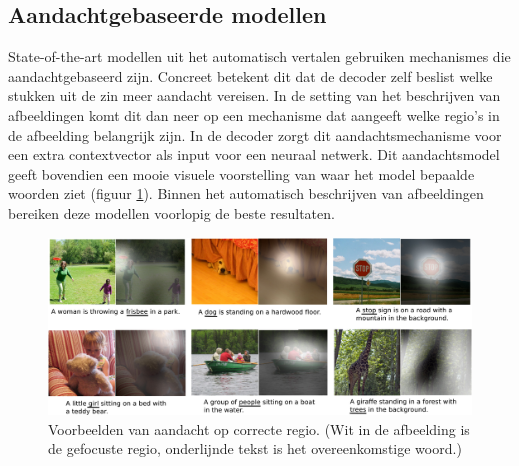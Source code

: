\subsection{Aandachtgebaseerde modellen}
State-of-the-art modellen uit het automatisch vertalen gebruiken mechanismes die aandachtgebaseerd zijn. Concreet betekent dit dat de decoder zelf beslist welke stukken uit de zin meer aandacht vereisen.
In de setting van het beschrijven van afbeeldingen komt dit dan neer op een mechanisme dat aangeeft welke regio's in de afbeelding belangrijk zijn. In de decoder zorgt dit aandachtsmechanisme voor een extra contextvector als input voor een neuraal netwerk. Dit aandachtsmodel geeft bovendien een mooie visuele voorstelling van waar het model bepaalde woorden ziet (figuur \ref{fig:attention-example}). Binnen het automatisch beschrijven van afbeeldingen bereiken deze modellen\cite{Xu2015,Jin2015} voorlopig de beste resultaten.

\begin{figure}[tb]
	\centering
	\includegraphics[width=\linewidth]{Images/good_Xu.pdf}
	\caption{Voorbeelden van aandacht op correcte regio. (Wit in de afbeelding is de gefocuste regio, onderlijnde tekst is het overeenkomstige woord.)\cite{Xu2015}}
	\label{fig:attention-example}
\end{figure}


